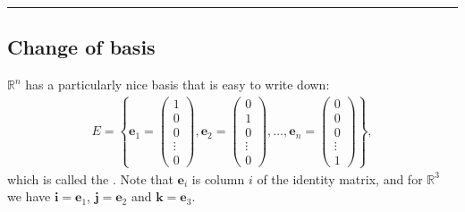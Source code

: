 \documentclass[letterpaper,10pt,english]{jupyterBook}
\begin{document}
\bigskip\hrule\bigskip


\ignorespaces 
{}\ignorespaces 

\subsection{Change of basis}
\label{\detokenize{_pages/5.4_Basis:change-of-basis}}\label{\detokenize{_pages/5.4_Basis:change-of-basis-section}}\label{\detokenize{_pages/5.4_Basis:index-6}}\label{\detokenize{_pages/5.4_Basis:index-5}}
\sphinxAtStartPar
\(\mathbb{R}^n\) has a particularly nice basis that is easy to write down:
\begin{equation*}
\begin{split} E = \left\{
        \mathbf{e}_1 = \begin{pmatrix} 1 \\ 0 \\ 0 \\ \vdots \\ 0 \end{pmatrix},
        \mathbf{e}_2 = \begin{pmatrix} 0 \\ 1 \\ 0 \\ \vdots \\ 0 \end{pmatrix}, \ldots,
        \mathbf{e}_n = \begin{pmatrix} 0 \\ 0 \\ 0 \\ \vdots \\ 1 \end{pmatrix}
        \right\}, \end{split}
\end{equation*}
\sphinxAtStartPar
which is called the . Note that \(\mathbf{e}_i\) is column \(i\) of the identity matrix, and for \(\mathbb{R}^3\) we have \(\mathbf{i} = \mathbf{e}_1\), \(\mathbf{j} = \mathbf{e}_2\) and \(\mathbf{k} = \mathbf{e}_3\).
\end{document}
